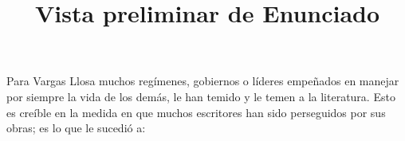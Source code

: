 \documentclass[a4paper,12pt]{article}\usepackage[utf8]{inputenc}\usepackage[spanish]{babel}\usepackage{times}
\title{Vista preliminar de Enunciado}
\begin{document}
\twocolumn 

\maketitle

Para Vargas Llosa muchos regímenes, gobiernos o líderes empeñados en manejar por siempre la vida de los demás, le han temido y le temen a la literatura. Esto es creíble en la medida en que muchos escritores han sido perseguidos por sus obras; es lo que le sucedió a:
\end{document}

